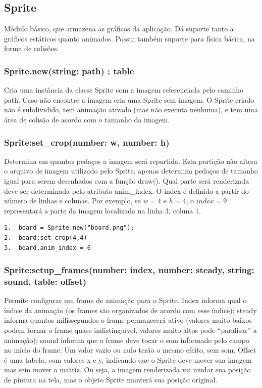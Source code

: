 \documentclass[
	12pt,				%
	openright,			%
	oneside,			%
	a4paper,			%
	brazil,				%
	]{abntex2}
\begin{document}
\subsection{Sprite}

Módulo básico, que armazena as gráficos da aplicação. Dá suporte tanto a gráficos estáticos quanto animados. Possui também suporte para física básica, na forma de colisões.

\subsubsection{Sprite.new(string: path) : table}

Cria uma instância da classe Sprite com a imagem referenciada pelo caminho path. Caso não encontre a imagem cria uma Sprite sem imagem. O Sprite criado não é subdividido, tem animação ativado (mas não executa nenhuma), e tem uma área de colisão de acordo com o tamanho da imagem.

\subsubsection{Sprite:set\_crop(number: w, number: h)}

Determina em quantos pedaços a imagem será repartida. Esta partição não altera o arquivo de imagem utilizado pelo Sprite, apenas determina pedaços de tamanho igual para serem desenhados com a função draw(). Qual parte será renderizada deve ser determinada pelo atributo anim\_index. O index é definido a partir do número de linhas e colunas. Por exemplo, se $w = 4$ e $h = 4$, o $index = 9$ representará a parte da imagem localizada na linha 3, coluna 1.

\begin{lstlisting}[caption={Exemplo de uso da função set\_crop},label=cod_sprite_1,frame=single]
1.	board = Sprite.new("board.png");
2.	board:set_crop(4,4)
3.	board.anim_index = 6
\end{lstlisting}

\subsubsection{Sprite:setup\_frames(number: index, number: steady, string: sound, table: offset)}

Permite configurar um frame de animação para o Sprite.  Index informa qual o índice da animação (os frames são organizados de acordo com esse índice); steady informa quantos milissegundos o frame permanecerá ativo (valores muito baixos podem tornar o frame quase indistinguível, valores muito altos pode “paralisar” a animação); sound informa que o frame deve tocar o som informado pelo campo no início do frame. Um valor vazio ou nulo terão o mesmo efeito, sem som. Offset é uma tabela, com valores x e y, indicando que o Sprite deve mover sua imagem mas sem mover a matriz. Ou seja, a imagem renderizada vai mudar sua posição de pintura na tela, mas o objeto Sprite manterá sua posição original.
\end{document}
